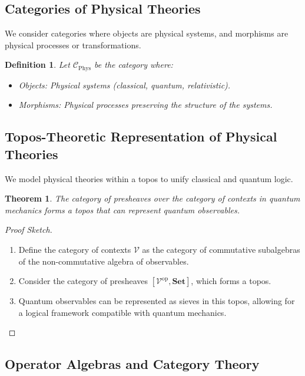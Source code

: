 \documentclass[12pt]{article}
\newtheorem{definition}{Definition}[section]
\newtheorem{theorem}{Theorem}[section]
\newcommand{\Set}{\mathbf{Set}}
\begin{document}
\subsection{Categories of Physical Theories}

We consider categories where objects are physical systems, and morphisms are physical processes or transformations.

\begin{definition}
Let $\mathcal{C}_{\text{Phys}}$ be the category where:
\begin{itemize}
    \item Objects: Physical systems (classical, quantum, relativistic).
    \item Morphisms: Physical processes preserving the structure of the systems.
\end{itemize}
\end{definition}

\subsection{Topos-Theoretic Representation of Physical Theories}

We model physical theories within a topos to unify classical and quantum logic.

\begin{theorem}
The category of presheaves over the category of contexts in quantum mechanics forms a topos that can represent quantum observables.
\end{theorem}

\begin{proof}[Proof Sketch]
\leavevmode
\begin{enumerate}[label=\arabic*.]
    \item Define the category of contexts $\mathcal{V}$ as the category of commutative subalgebras of the non-commutative algebra of observables.
    \item Consider the category of presheaves $[\mathcal{V}^{\mathrm{op}}, \Set]$, which forms a topos.
    \item Quantum observables can be represented as sieves in this topos, allowing for a logical framework compatible with quantum mechanics.
\end{enumerate}
\end{proof}

\subsection{Operator Algebras and Category Theory}
\end{document}
